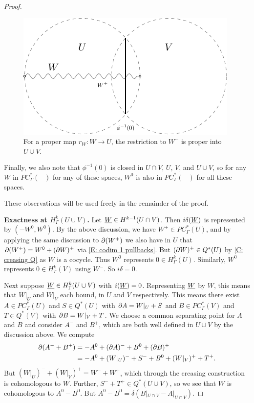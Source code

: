 \begin{proof}
\begin{figure}[h]
	\includegraphics[scale=1]{figures/mayer_vietoris2.pdf}
	\caption{For a proper map $r_W:W\to U$, the restriction to $W^-$ is proper into $U\cup V$. }
\label{F: MV2}
\end{figure}

Finally, we also note that $\phi^{-1}(0)$ is closed in $U\cap V$, $U$, $V$, and $U\cup V$, so for any $W$ in $PC_\Gamma^*(-)$ for any of these spaces, $W^0$ is also in $PC^*_\Gamma(-)$ for all these spaces.



These observations will be used freely in the remainder of the proof.

\textbf{Exactness at $H^k_\Gamma(U\cup V)$.}
Let $\underline{W}\in H^{k-1}(U\cap V)$. Then $i\delta(\underline{W})$ is represented by $(-W^0,  W^0)$. By the above discussion, we have $W^+\in PC^*_\Gamma(U)$, and by applying the same discussion to $\partial (W^+)$ we also have in $U$ that $\partial (W^+)=W^0+(\partial W)^+$ via \cref{E: codim 1 pullbacks}. But $(\partial W)^+\in Q^*(U)$ by \cref{C: creasing Q} as $W$ is a cocycle. Thus $W^0$ represents $0\in H^k_\Gamma(U)$. Similarly, $W^0$ represents $0\in H^k_\Gamma(V)$ using $W^-$. So $i\delta=0$.

Next suppose $\underline{W}\in H^k_\Gamma(U\cup V)$ with $i(\underline{W})=0$. Representing $\underline{W}$ by $W$, this means that $W|_U$ and $W|_V$ each bound, in $U$ and $V$ respectively. This means there exist  $A\in PC^*_\Gamma(U)$ and $S\in Q^*(U)$ with $\partial A=W|_U+S$ and $B\in PC^*_\Gamma(V)$ and $T\in Q^*(V)$ with $\partial B=W|_V+T$. We choose a common separating point for $A$ and $B$ and consider $A^-$ and $B^+$, which are both well defined in $U\cup V$ by the discussion above. We compute
\begin{align*}
\partial(A^-+B^+)&=-A^0 + (\partial A)^- +B^0+ (\partial B)^+\\
&=-A^0 + (W|_U)^-+S^-  +B^0+ (W|_V)^++T^+.
\end{align*}
But   $(W|_U)^- +(W|_V)^+=W^-+W^+$, which through the creasing construction is cohomologous to $W$. Further, $S^-+T^+\in Q^*(U\cup V)$, so we see that $W$ is cohomologous to $A^0-B^0$. But $A^0-B^0=\delta(B|_{U\cap V}-A|_{U\cap V})$.




\end{proof}
